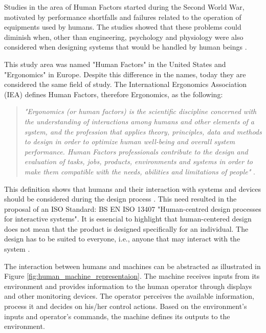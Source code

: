 Studies in the area of Human Factors started during the Second World War, motivated by performance shortfalls and failures related to the operation of equipments used by humans. The studies showed that these problems could diminish when, other than engineering, psychology and physiology were also considered when designing systems that would be handled by human beings \cite{sandom2004human}.

This study area was named "Human Factors" in the United States and "Ergonomics" in Europe. Despite this difference in the names, today they are considered the same field of study. The International Ergonomics Association (IEA) defines Human Factors, therefore Ergonomics, as the following:

\begin{quote}
    \textit{"Ergonomics (or human factors) is the scientific discipline concerned with the understanding of interactions among humans and other elements of a system, and the profession that applies theory, principles, data and methods to design in order to optimize human well-being and overall system performance. Human Factors professionals contribute to the design and evaluation of tasks, jobs, products, environments and systems in order to make them compatible with the needs, abilities and limitations of people"} \cite{karwowski2012discipline}.
\end{quote}

This definition shows that humans and their interaction with systems and devices should be considered during the design process \cite{sandom2004human, sanders1998human, dul2003ergonomics}. This need resulted in the proposal of an ISO Standard: BS EN ISO 13407 "Human-centred design processes for interactive systems". It is essencial to highlight that human-centered design does not mean that the product is designed specifically for an individual. The design has to be suited to everyone, i.e., anyone that may interact with the system \cite{dul2003ergonomics}.

The interaction between humans and machines can be abstracted as illustrated in Figure \ref{fig:human_machine_representaion}. The machine receives inputs from its environment and provides information to the human operator through displays and other monitoring devices. The operator perceives the available information, process it and decides on his/her control actions. Based on the environment's inputs and operator's commands, the machine defines its outputs to the environment.



